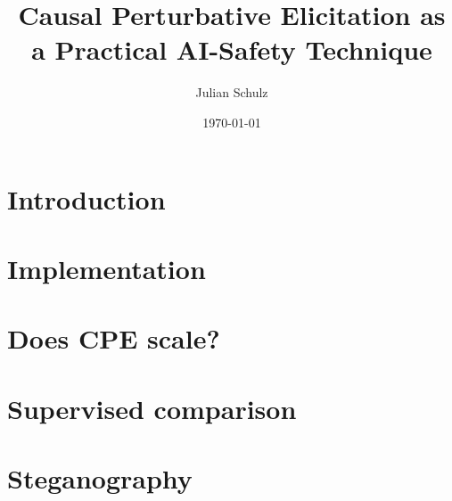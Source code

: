 \documentclass[aspectratio=169]{beamer}
\title{Causal Perturbative Elicitation as a Practical AI-Safety Technique}
\author{Julian Schulz}
\date{\today}
\begin{document}
\begin{frame}[plain]
  \titlepage
\end{frame}

\section{Introduction}


\section{Implementation}


\section{Does CPE scale?}


\section{Supervised comparison}


\section{Steganography}

\end{document}
